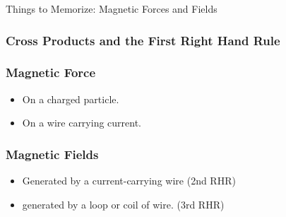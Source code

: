 \documentclass[letterpaper, 12pt]{article}
\begin{document}
	


\begin{center}Things to Memorize: Magnetic Forces and Fields
\end{center}

\subsubsection*{Cross Products and the First Right Hand Rule}


\subsubsection*{Magnetic Force}
\begin{itemize}
	\item On a charged particle.
	\item On a wire carrying current.
	
\end{itemize}
\subsubsection*{Magnetic Fields}
\begin{itemize}
	\item Generated by a current-carrying wire (2nd RHR)
	\item generated by a loop or coil of wire. (3rd RHR)
\end{itemize}
\end{document}
